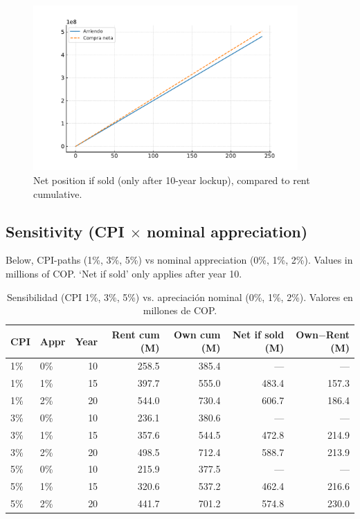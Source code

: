 \documentclass[12pt]{article}
\begin{document}
\begin{figure}[h]
\centering
\includegraphics[width=0.9\textwidth]{net_if_sold_dominant.pdf}
\caption{Net position if sold (only after 10-year lockup), compared to rent cumulative.}
\end{figure}

\subsection*{Sensitivity (CPI $\times$ nominal appreciation)}
Below, CPI-paths (1\%, 3\%, 5\%) vs nominal appreciation (0\%, 1\%, 2\%). Values in millions of COP. `Net if sold' only applies after year 10.

\begin{table}[h]
\centering
\small
\begin{tabular}{llrrrrr}
\hline
CPI & Appr & Year & Rent cum (M) & Own cum (M) & Net if sold (M) & Own$-$Rent (M) \\
\hline
1\% & 0\% & 10 & 258.5 & 385.4 & --- & --- \\
1\% & 1\% & 15 & 397.7 & 555.0 & 483.4 & 157.3 \\
1\% & 2\% & 20 & 544.0 & 730.4 & 606.7 & 186.4 \\
3\% & 0\% & 10 & 236.1 & 380.6 & --- & --- \\
3\% & 1\% & 15 & 357.6 & 544.5 & 472.8 & 214.9 \\
3\% & 2\% & 20 & 498.5 & 712.4 & 588.7 & 213.9 \\
5\% & 0\% & 10 & 215.9 & 377.5 & --- & --- \\
5\% & 1\% & 15 & 320.6 & 537.2 & 462.4 & 216.6 \\
5\% & 2\% & 20 & 441.7 & 701.2 & 574.8 & 230.0 \\ \hline
\end{tabular}
\caption{Sensibilidad (CPI 1\%, 3\%, 5\%) vs. apreciaci\'on nominal (0\%, 1\%, 2\%). Valores en millones de COP.}
\label{tab:sensitivity}
\end{table}
\end{document}
